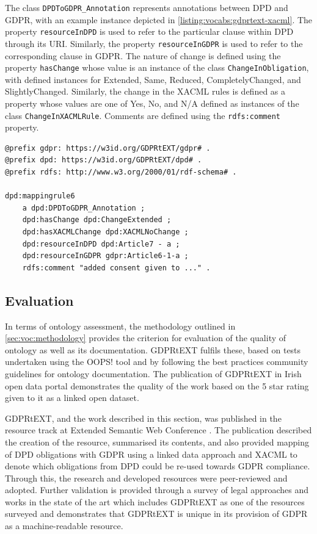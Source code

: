 The class \texttt{DPDToGDPR\_Annotation} represents annotations between DPD and GDPR, with an example instance depicted in \autoref{listing:vocabs:gdprtext-xacml}. The property \texttt{resourceInDPD} is used to refer to the particular clause within DPD through its URI. Similarly, the property \texttt{resourceInGDPR} is used to refer to the corresponding clause in GDPR. The nature of change is defined using the property \texttt{hasChange} whose value is an instance of the class \texttt{ChangeInObligation}, with defined instances for Extended, Same, Reduced, CompletelyChanged, and SlightlyChanged. Similarly, the change in the XACML rules is defined as a property whose values are one of Yes, No, and N/A defined as instances of the class \texttt{ChangeInXACMLRule}. Comments are defined using the \texttt{rdfs:comment} property.
\begin{lstlisting}[label={listing:vocabs:gdprtext-xacml},caption={Example annotation of associating obligation between DPD and GDPR with indication of corresponding changes required to reuse DPD compliance XACML rules for GDPR requirements}]
@prefix gdpr: https://w3id.org/GDPRtEXT/gdpr# .
@prefix dpd: https://w3id.org/GDPRtEXT/dpd# .
@prefix rdfs: http://www.w3.org/2000/01/rdf-schema# .

dpd:mappingrule6
    a dpd:DPDToGDPR_Annotation ;
    dpd:hasChange dpd:ChangeExtended ;
    dpd:hasXACMLChange dpd:XACMLNoChange ;
    dpd:resourceInDPD dpd:Article7 - a ;
    dpd:resourceInGDPR gdpr:Article6-1-a ;
    rdfs:comment "added consent given to ..." .
\end{lstlisting}


\subsection{Evaluation}
In terms of ontology assessment, the methodology outlined in \autoref{sec:voc:methodology} provides the criterion for evaluation of the quality of ontology as well as its documentation. GDPRtEXT fulfils these, based on tests undertaken using the OOPS! tool and by following the best practices community guidelines for ontology documentation.
The publication of GDPRtEXT in Irish open data portal demonstrates the quality of the work based on the 5 star rating given to it as a linked open dataset.

GDPRtEXT, and the work described in this section, was published in the resource track at Extended Semantic Web Conference \cite{}. The publication described the creation of the resource, summarised its contents, and also provided mapping of DPD obligations with GDPR using a linked data approach and XACML to denote which obligations from DPD could be re-used towards GDPR compliance. Through this, the research and developed resources were peer-reviewed and adopted.
Further validation is provided through a survey of legal approaches and works in the state of the art \cite{} which includes GDPRtEXT as one of the resources surveyed and demonstrates that GDPRtEXT is unique in its provision of GDPR as a machine-readable resource.

